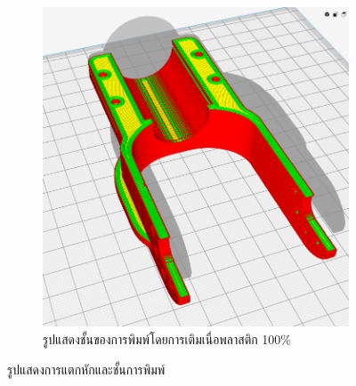 \begin{figure}[h!]
\begin{subfigure}[b]{0.4\linewidth}
        \includegraphics[width=\linewidth]{chapter4/images/fatigue3.png}
        \caption{รูปแสดงชั้นของการพิมพ์โดยการเติมเนื่อพลาสติก 100\%}
    \end{subfigure}
    \caption{รูปแสดงการแตกหักและชั้นการพิมพ์}
    \label{fig:fatiguelayer}
  \end{figure}


